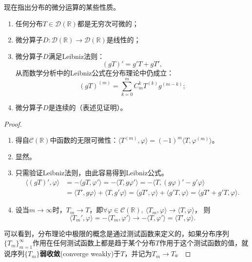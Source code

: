 现在指出分布的微分运算的某些性质\cite{zorich}。
\begin{theorem}[分布的微分运算的性质]
    \begin{enumerate}
        \item 任何分布$T\in\mathcal{D}(\mathbb{R})$都是无穷次可微的；
        \item 微分算子$D:\mathcal{D}(\mathbb{R})\to\mathcal{D}(\mathbb{R})$是线性的；
        \item 微分算子$D$满足Leibniz法则：
              \begin{equation}
                  (gT)'=g'T+gT',
              \end{equation}
              从而数学分析中的Leibniz公式在分布理论中仍成立：
              \begin{equation}
                  (gT)^{(m)}=\sum_{k=0}^{m}C_m^k T^{(k)}g^{(m-k)};
              \end{equation}
        \item 微分算子$D$是连续的（表述见证明）。
    \end{enumerate}
\end{theorem}
\begin{proof}
    \begin{enumerate}
        \item 得自$\mathcal{C}(\mathbb{R})$中函数的无限可微性：$\langle T^{(m)},\varphi\rangle=(-1)^m\langle T,\varphi^{(m)}\rangle$。
        \item 显然。
        \item 只需验证Leibniz法则，由此容易得到Leibniz公式。
              \begin{align}
                  \langle (gT)',\varphi\rangle & =-\langle gT,\varphi'\rangle=-\langle T,g\varphi'\rangle=-\langle T,(g\varphi)'-g'\varphi\rangle\nonumber \\
                                               & =\langle T',g\varphi\rangle+\langle T,g'\varphi\rangle=\langle gT',\varphi\rangle+\langle g'T,\varphi\rangle=\langle gT'+g'T,\varphi\rangle.
              \end{align}
        \item 设当$m\to\infty$时，$T_m\to T$，即$\forall\varphi\in\mathcal{C}(\mathbb{R}),\ \langle T_m,\varphi\rangle\to\langle T,\varphi\rangle$，
              则
              \begin{equation}
                  \langle T_m',\varphi\rangle=-\langle T_m,\varphi'\rangle\to-\langle T,\varphi'\rangle=\langle T',\varphi\rangle.
              \end{equation}
    \end{enumerate}
    可以看到，分布理论中极限的概念是通过测试函数来定义的，如果分布序列$\{T_m\}_{m=1}^{\infty}$作用在任何测试函数上都是趋于某个分布$T$作用于这个测试函数的值，就说序列$\{T_m\}$\textbf{弱收敛}(converge weakly)于$T$，并记为$T_m\to T$\cite{folland}。
\end{proof}

